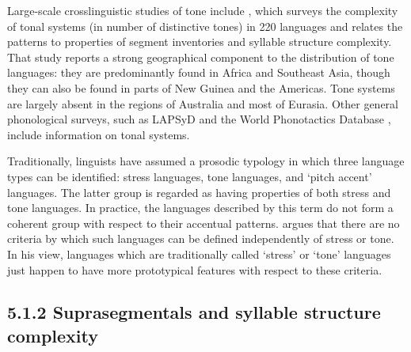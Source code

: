   Large-scale crosslinguistic studies of tone include \citet{Maddieson2013d}, which surveys the complexity of tonal systems (in number of distinctive tones) in 220 languages and relates the patterns to properties of segment inventories and syllable structure complexity. That study reports a strong geographical component to the distribution of tone languages: they are predominantly found in Africa and Southeast Asia, though they can also be found in parts of New Guinea and the Americas. Tone systems are largely absent in the regions of Australia and most of Eurasia. Other general phonological surveys, such as LAPSyD \citep{MaddiesonEtAl2013} and the World Phonotactics Database \citep{DonohueEtAl2013}, include information on tonal systems.

  Traditionally, linguists have assumed a prosodic typology in which three language types can be identified: stress languages, tone languages, and ‘pitch accent’ languages. The latter group is regarded as having properties of both stress and tone languages. In practice, the languages described by this term do not form a coherent group with respect to their accentual patterns. \citet{Hyman2009} argues that there are no criteria by which such languages can be defined independently of stress or tone. In his view, languages which are traditionally called ‘stress’ or ‘tone’ languages just happen to have more prototypical features with respect to these criteria.

\subsection{5.1.2 Suprasegmentals and syllable structure complexity}

